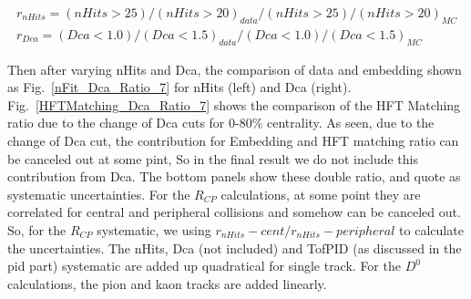 \begin{equation}
  \begin{aligned}
  r_{nHits} = (nHits>25)/(nHits>20)_{data} / (nHits>25)/(nHits>20)_{MC} \\
  r_{Dca} = (Dca<1.0)/(Dca<1.5)_{data} / (Dca<1.0)/(Dca<1.5)_{MC}
\end{aligned}
\label{nHitDca_eq}
\end{equation}

Then after varying nHits and Dca, the comparison of data and embedding shown as Fig.~\ref{nFit_Dca_Ratio_7} for nHits (left) and Dca (right). Fig.~\ref{HFTMatching_Dca_Ratio_7} shows the comparison of the HFT Matching ratio due to the change of Dca cuts for 0-80\% centrality. As seen, due to the change of Dca cut, the contribution for Embedding and HFT matching ratio can be canceled out at some pint, So in the final result we do not include this contribution from Dca. The bottom panels show these double ratio, and quote as systematic uncertainties. For the $R_{CP}$ calculations, at some point they are correlated for central and peripheral collisions and somehow can be canceled out. So, for the $R_{CP}$ systematic, we using $r_{nHits}-cent / r_{nHits}-peripheral$ to calculate the uncertainties. The nHits, Dca (not included) and TofPID (as discussed in the pid part) systematic are added up quadratical for single track. For the $D^0$ calculations, the pion and kaon tracks are added linearly.

